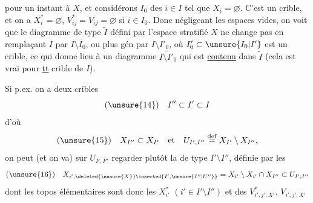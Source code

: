  pour un instant à $X$, et considérons   $I_0$ des $i\in I$ tel que $X_i=\varnothing$. C'est un crible, et on a $X_i^*=\varnothing$, $V_{ij}^*=V_{ij}=\varnothing$ si $i\in I_0$. Donc négligeant les espaces vides, on voit que le diagramme de type $\widetilde I$ défini par l'espace stratifié $X$ ne change pas  en remplaçant $I$ par $I\setminus I_0$, ou plus gén par $I\setminus I'_0$, où $I'_0\subset\unsure{I_0|I'}$ est un crible, ce qui donne lieu à un diagramme $\widetilde{I\setminus I'_0}$ qui est \uline{contenu} dans $\widetilde I$ (cela est vrai pour \uline{tt} crible de $I$).

Si p.ex. on a deux cribles
\[
(\unsure{14})\quad I''\subset I'\subset I
\]
d'où
\[
(\unsure{15})\quad X_{I''}\subset X_{I'}\quad\text{et}\quad U_{I',I''}\overset{\mathrm{def}}{=}X_{I'}\setminus X_{I''},
\]
on peut  (et on va) sur $U_{I',I''}$ regarder plutôt la   de type $I'\setminus I''$, définie par les
\[
(\unsure{16})\quad X_{i',\deleted{\unsure{X}}\inserted{I',\unsure{I''|U''}}}=X_{i'}\setminus X_{i'}\cap X_{I''}\subset U_{I',I''}
\]
dont les topos élémentaires sont donc les $X_{i'}^*$ $(i'\in I'\setminus I'')$ et des $V^*_{i',j',X'}$, $V_{i',j',X'}$

